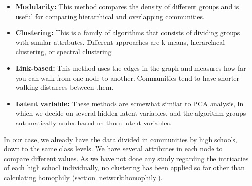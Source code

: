 \begin{itemize}

    \item \textbf{Modularity:} This method compares the density of different groups and is useful for comparing hierarchical and overlapping communities.
    
    \item \textbf{Clustering:} This is a family of algorithms that consists of dividing groups with similar attributes. Different approaches are k-means, hierarchical clustering, or spectral clustering
    
    \item \textbf{Link-based:} This method uses the edges in the graph and measures how far you can walk from one node to another. Communities tend to have shorter walking distances between them.

    \item \textbf{Latent variable:} These methods are somewhat similar to PCA analysis, in which we decide on several hidden latent variables, and the algorithm groups automatically nodes based on those latent variables.

\end{itemize}

In our case, we already have the data divided in communities by high schools, down to the same class levels. We have several attributes in each node to compare different values. As we have not done any study regarding the intricacies of each high school individually, no clustering has been applied so far other than calculating homophily (section \ref{network:homophily}).







